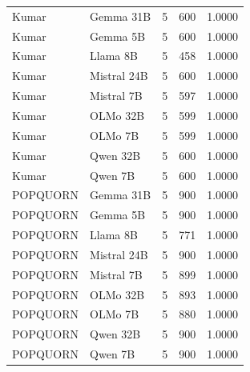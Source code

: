 \begin{table}[t]
\begin{tabular}{llrrl}
Kumar & Gemma 31B & 5 & 600 & 1.0000 \\
Kumar & Gemma 5B & 5 & 600 & 1.0000 \\
Kumar & Llama 8B & 5 & 458 & 1.0000 \\
Kumar & Mistral 24B & 5 & 600 & 1.0000 \\
Kumar & Mistral 7B & 5 & 597 & 1.0000 \\
Kumar & OLMo 32B & 5 & 599 & 1.0000 \\
Kumar & OLMo 7B & 5 & 599 & 1.0000 \\
Kumar & Qwen 32B & 5 & 600 & 1.0000 \\
Kumar & Qwen 7B & 5 & 600 & 1.0000 \\
POPQUORN & Gemma 31B & 5 & 900 & 1.0000 \\
POPQUORN & Gemma 5B & 5 & 900 & 1.0000 \\
POPQUORN & Llama 8B & 5 & 771 & 1.0000 \\
POPQUORN & Mistral 24B & 5 & 900 & 1.0000 \\
POPQUORN & Mistral 7B & 5 & 899 & 1.0000 \\
POPQUORN & OLMo 32B & 5 & 893 & 1.0000 \\
POPQUORN & OLMo 7B & 5 & 880 & 1.0000 \\
POPQUORN & Qwen 32B & 5 & 900 & 1.0000 \\
POPQUORN & Qwen 7B & 5 & 900 & 1.0000 \\
\bottomrule
\end{tabular}
\end{table}
